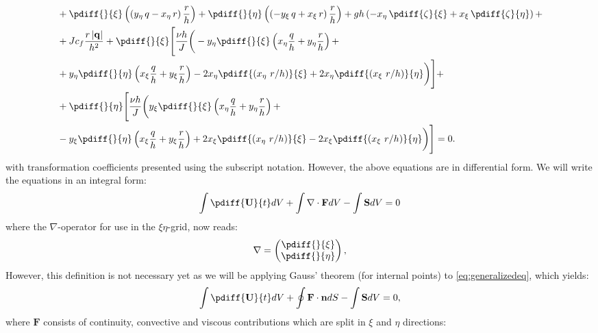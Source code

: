 {{\begin{align}
\begin{aligned}
			&+ \pdiff{}{\xi} \left(\left( y_{\eta}\, q- x_{\eta}\, r \right)\frac{r}{h}\right)
			+ \pdiff{}{\eta} \left(\left( -y_{\xi}\, q + x_{\xi}\, r \right)\frac{r}{h}\right)
			+ g h \left( -x_{\eta}\, \pdiff{\zeta}{\xi} + x_{\xi}\, \pdiff{\zeta}{\eta} \right) +
            \\
			&+ J c_f \frac{r\, |\mathbf{q}|}{h^2}
			+  \pdiff{}{\xi} \Bigg[\frac{\nu h}{J} \bigg(
			-y_{\eta} \pdiff{}{\xi} \left(
			x_{\eta} \frac{q}{h} + y_{\eta} \frac{r}{h} \right) + \\
			&+ y_{\eta} \pdiff{}{\eta} \left(
			x_{\xi} \frac{q}{h} + y_{\xi} \frac{r}{h}  \right)
			- 2 x_{\eta} \pdiff{(x_{\eta}\ r/h)}{\xi}
			+ 2 x_{\eta}  \pdiff{(x_{\xi}\ r/h)}{\eta} \bigg) \Bigg] +
            \\
			&+  \pdiff{}{\eta} \Bigg[\frac{\nu h}{J} \bigg(
			y_{\xi} \pdiff{}{\xi} \left(x_{\eta} \frac{q}{h}
			+ y_{\eta} \frac{r}{h} \right) + \\
			&- y_{\xi} \pdiff{}{\eta} \left( x_{\xi} \frac{q}{h} +  y_{\xi} \frac{r}{h} \right)
			+ 2 x_{\xi} \pdiff{(x_{\eta}\ r/h)}{\xi}
			- 2 x_{\xi} \pdiff{(x_{\xi}\ r/h)}{\eta} \bigg) \Bigg] = 0.
		\end{aligned}
	\end{align}
%
with transformation coefficients presented using the subscript notation.
However, the above equations are in differential form.
We will write the equations in an integral form:
%
\begin{align}\label{eq:generalizedeq}
	\int \pdiff{\mathbf{U}}{t}dV + \int \nabla \cdot \mathbf{F} dV - \int \mathbf{S}dV = 0
\end{align}
%
where the $\nabla$-operator for use in the $\xi\eta$-grid, now reads:
%
\begin{align}
	\nabla=
	\begin{pmatrix}
		\pdiff{}{\xi}\\
		\pdiff{}{\eta}
	\end{pmatrix},
\end{align}
%
However, this definition is not necessary yet as we will be applying Gauss' theorem (for internal points) to \autoref{eq:generalizedeq}, which yields:
%
\begin{align}
	\int \pdiff{\mathbf{U}}{t}dV + \oint \mathbf{F}\cdot \mathbf{n}dS - \int \mathbf{S}dV = 0,
\end{align}
%
where $\mathbf{F}$ consists of continuity, convective and viscous contributions which are split in $\xi$ and $\eta$ directions:
%
	\begin{align}\label{eq:FxysplitT}

\end{align}}}
